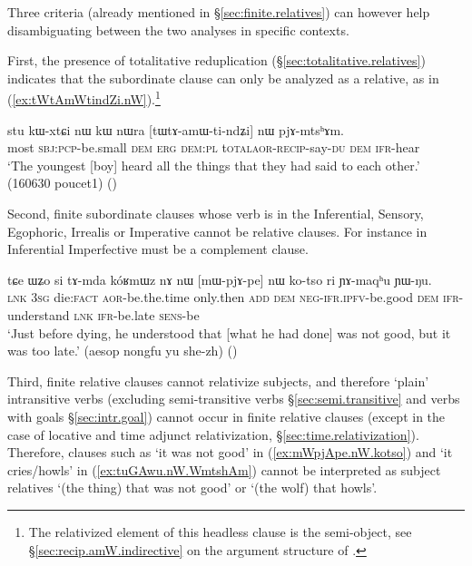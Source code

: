 Three criteria (already mentioned in §\ref{sec:finite.relatives}) can however help disambiguating between the two analyses in specific contexts. 

First, the presence of totalitative reduplication (§\ref{sec:totalitative.relatives}) indicates that the subordinate clause can only be analyzed as a relative, as in (\ref{ex:tWtAmWtindZi.nW}).\footnote{The relativized element of this headless clause is the semi-object, see §\ref{sec:recip.amW.indirective} on the argument structure of . }
 
\begin{exe}
\ex \label{ex:tWtAmWtindZi.nW}
\gll  stu kɯ-xtɕi nɯ kɯ nɯra [tɯ\redp{}tɤ-amɯ-ti-ndʑi] nɯ pjɤ-mtsʰɤm. \\
most \textsc{sbj}:\textsc{pcp}-be.small \textsc{dem} \textsc{erg} \textsc{dem}:\textsc{pl} t\textsc{otal}\redp{}\textsc{aor}-\textsc{recip}-say-\textsc{du} \textsc{dem} \textsc{ifr}-hear \\
\glt `The youngest [boy] heard all the things that they had said to each other.' (160630 poucet1)
()
\end{exe}

Second, finite subordinate clauses whose verb is in the Inferential, Sensory, Egophoric, Irrealis or Imperative cannot be relative clauses. For instance  in Inferential Imperfective must be a complement clause.

\begin{exe}
\ex \label{ex:mWpjApe.nW.kotso}
\gll tɕe ɯʑo si tɤ-mda kóʁmɯz nɤ nɯ [mɯ-pjɤ-pe] nɯ ko-tso ri ɲɤ-maqʰu ɲɯ-ŋu. \\
\textsc{lnk} \textsc{3sg} die:\textsc{fact} \textsc{aor}-be.the.time only.then \textsc{add} \textsc{dem} \textsc{neg}-\textsc{ifr}.\textsc{ipfv}-be.good \textsc{dem} \textsc{ifr}-understand \textsc{lnk} \textsc{ifr}-be.late \textsc{sens}-be \\
\glt  `Just before dying, he understood that [what he had done] was not good, but it was too late.' (aesop nongfu yu she-zh)
()
\end{exe}

Third, finite relative clauses cannot relativize subjects, and therefore `plain' intransitive verbs (excluding semi-transitive verbs §\ref{sec:semi.transitive} and verbs with goals §\ref{sec:intr.goal}) cannot occur in finite relative clauses (except in the case of locative and time adjunct relativization, §\ref{sec:time.relativization}). Therefore, clauses such as  `it was not good' in (\ref{ex:mWpjApe.nW.kotso}) and  `it cries/howls' in (\ref{ex:tuGAwu.nW.WmtshAm}) cannot be interpreted as subject relatives `(the thing) that was not good' or `(the wolf) that howls'.

